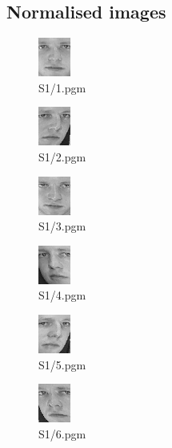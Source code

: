 \documentclass[dvipsnames]{article}
\begin{document}
\subsection*{Normalised images}
\begin{multicols}{3}
\begin{figure}[H]
	\centering\includegraphics{Out-JPG/S1/1.jpg}
	\caption{S1/1.pgm}
\end{figure}
\begin{figure}[H]
	\centering\includegraphics{Out-JPG/S1/2.jpg}
	\caption{S1/2.pgm}
\end{figure}

\begin{figure}[H]
	\centering\includegraphics{Out-JPG/S1/3.jpg}
	\caption{S1/3.pgm}
\end{figure}

\begin{figure}[H]
	\centering\includegraphics{Out-JPG/S1/4.jpg}
	\caption{S1/4.pgm}
\end{figure}

\begin{figure}[H]
	\centering\includegraphics{Out-JPG/S1/5.jpg}
	\caption{S1/5.pgm}
\end{figure}

\begin{figure}[H]
	\centering\includegraphics{Out-JPG/S1/6.jpg}
	\caption{S1/6.pgm}
\end{figure}


\end{multicols}
\end{document}
